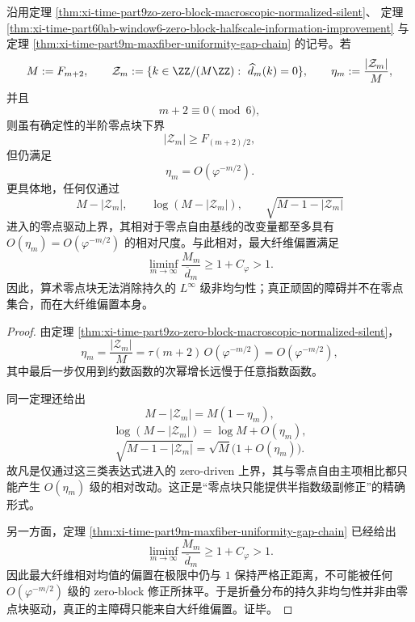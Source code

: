 \begin{theorem}[零点块对持久大纤维偏置的无力性]\label{thm:xi-time-part9zoa-zero-block-maxfiber-impotence}
沿用定理 \ref{thm:xi-time-part9zo-zero-block-macroscopic-normalized-silent}、
定理 \ref{thm:xi-time-part60ab-window6-zero-block-halfscale-information-improvement}
与定理 \ref{thm:xi-time-part9m-maxfiber-uniformity-gap-chain} 的记号。若
\[
M:=F_{m+2},
\qquad
\mathcal Z_m:=\{k\in \ZZ/(M\ZZ):\ \widehat d_m(k)=0\},
\qquad
\eta_m:=\frac{|\mathcal Z_m|}{M},
\]
并且
\[
m+2\equiv 0\pmod 6,
\]
则虽有确定性的半阶零点块下界
\[
|\mathcal Z_m|\ge F_{(m+2)/2},
\]
但仍满足
\[
\eta_m=O(\varphi^{-m/2}).
\]
更具体地，任何仅通过
\[
M-|\mathcal Z_m|,
\qquad
\log(M-|\mathcal Z_m|),
\qquad
\sqrt{M-1-|\mathcal Z_m|}
\]
进入的零点驱动上界，其相对于零点自由基线的改变量都至多具有 \(O(\eta_m)=O(\varphi^{-m/2})\) 的相对尺度。与此相对，最大纤维偏置满足
\[
\liminf_{m\to\infty}\frac{M_m}{\overline d_m}\ge 1+C_\varphi>1.
\]
因此，算术零点块无法消除持久的 \(L^\infty\) 级非均匀性；真正顽固的障碍并不在零点集合，而在大纤维偏置本身。
\end{theorem}
\begin{proof}
由定理 \ref{thm:xi-time-part9zo-zero-block-macroscopic-normalized-silent}，
\[
\eta_m=\frac{|\mathcal Z_m|}{M}
=
\tau(m+2)\,O(\varphi^{-m/2})
=
O(\varphi^{-m/2}),
\]
其中最后一步仅用到约数函数的次幂增长远慢于任意指数函数。

同一定理还给出
\[
M-|\mathcal Z_m|=M(1-\eta_m),
\]
\[
\log(M-|\mathcal Z_m|)=\log M+O(\eta_m),
\]
\[
\sqrt{M-1-|\mathcal Z_m|}
=
\sqrt M\bigl(1+O(\eta_m)\bigr).
\]
故凡是仅通过这三类表达式进入的 zero-driven 上界，其与零点自由主项相比都只能产生 \(O(\eta_m)\) 级的相对改动。这正是“零点块只能提供半指数级副修正”的精确形式。

另一方面，定理 \ref{thm:xi-time-part9m-maxfiber-uniformity-gap-chain} 已经给出
\[
\liminf_{m\to\infty}\frac{M_m}{\overline d_m}\ge 1+C_\varphi>1.
\]
因此最大纤维相对均值的偏置在极限中仍与 \(1\) 保持严格正距离，不可能被任何 \(O(\varphi^{-m/2})\) 级的 zero-block 修正所抹平。于是折叠分布的持久非均匀性并非由零点块驱动，真正的主障碍只能来自大纤维偏置。证毕。
\end{proof}

\endinput
